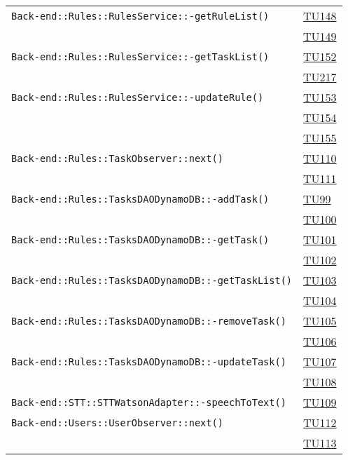 \begin{longtable}{|>{\centering}m{12cm}|m{1cm}<{\centering}|}
\texttt{Back-end::Rules::RulesService::-\linebreak getRuleList()} & \hyperlink{TU148}{TU148}\\ & \hyperlink{TU149}{TU149}\\ \hline
\texttt{Back-end::Rules::RulesService::-\linebreak getTaskList()} & \hyperlink{TU152}{TU152}\\ & \hyperlink{TU217}{TU217}\\ \hline
\texttt{Back-end::Rules::RulesService::-\linebreak updateRule()} & \hyperlink{TU153}{TU153}\\ & \hyperlink{TU154}{TU154}\\ & \hyperlink{TU155}{TU155}\\ \hline
\texttt{Back-end::Rules::TaskObserver::next()} & \hyperlink{TU110}{TU110}\\ & \hyperlink{TU111}{TU111}\\ \hline
\texttt{Back-end::Rules::TasksDAODynamoDB::-\linebreak addTask()} & \hyperlink{TU99}{TU99}\\ & \hyperlink{TU100}{TU100}\\ \hline
\texttt{Back-end::Rules::TasksDAODynamoDB::-\linebreak getTask()} & \hyperlink{TU101}{TU101}\\ & \hyperlink{TU102}{TU102}\\ \hline
\texttt{Back-end::Rules::TasksDAODynamoDB::-\linebreak getTaskList()} & \hyperlink{TU103}{TU103}\\ & \hyperlink{TU104}{TU104}\\ \hline
\texttt{Back-end::Rules::TasksDAODynamoDB::-\linebreak removeTask()} & \hyperlink{TU105}{TU105}\\ & \hyperlink{TU106}{TU106}\\ \hline
\texttt{Back-end::Rules::TasksDAODynamoDB::-\linebreak updateTask()} & \hyperlink{TU107}{TU107}\\ & \hyperlink{TU108}{TU108}\\ \hline
\texttt{Back-end::STT::STTWatsonAdapter::-\linebreak speechToText()} & \hyperlink{TU109}{TU109}\\ \hline
\texttt{Back-end::Users::UserObserver::next()} & \hyperlink{TU112}{TU112}\\ & \hyperlink{TU113}{TU113}\\ \hline

\end{longtable}
